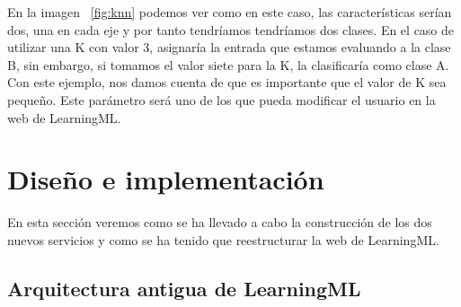 \documentclass[a4paper, 12pt]{book}
\begin{document}
En la imagen  ~\ref{fig:knn} podemos ver como en este caso, las características serían dos, una en cada eje y por tanto tendríamos tendríamos dos clases. En el caso de utilizar una K con valor 3, asignaría la entrada que estamos evaluando a la clase B, sin embargo, si tomamos el valor siete para la K, la clasificaría como clase A. Con este ejemplo, nos damos cuenta de que es importante que el valor de K sea pequeño. Este parámetro será uno de los que pueda modificar el usuario en la web de LearningML.



\cleardoublepage
\chapter{Diseño e implementación}

En esta sección veremos como se ha llevado a cabo la construcción de los dos nuevos servicios y como se ha tenido que reestructurar la web de LearningML.

\section{Arquitectura antigua de LearningML} 
\label{sec:arquitecturaantigua}
\end{document}
